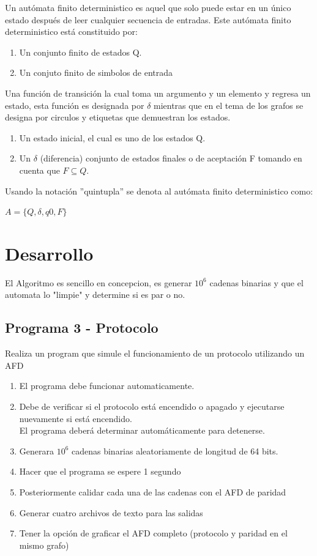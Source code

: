 \documentclass{article}
\begin{document}
    Un autómata finito deterministico es aquel que solo puede estar en un único estado después de leer cualquier
    secuencia de entradas. Este autómata finito deterministico está constituido por:
\begin{enumerate}
    \item Un conjunto finito de estados Q. 
    \item Un conjuto finito de simbolos de entrada
\end{enumerate}
    Una función de transición la cual toma un argumento y un elemento y regresa un estado, esta función es designada por $\delta$ mientras que en el tema de los grafos se designa por circulos y etiquetas que demuestran los estados.
\begin{enumerate}
    \item Un estado inicial, el cual es uno de los estados Q.
    \item Un $\delta$ (diferencia) conjunto de estados finales o de aceptación F tomando en cuenta que $F \subseteq  Q$.
\end{enumerate}
    
    Usando la notación ”quintupla” se denota al autómata finito deterministico como:
\begin{center}
    $A = \{Q, \delta , q0 , F \}$
\end{center}
    
\section{Desarrollo}
El Algoritmo es sencillo en concepcion, es generar $10^6$ cadenas binarias y que el automata lo "limpie" y determine si es par o no.

\subsection{Programa 3 - Protocolo}
Realiza un program que simule el funcionamiento de un protocolo utilizando un AFD\begin{enumerate}
    \item El programa debe funcionar automaticamente.
    \item Debe de verificar si el protocolo está encendido o apagado y ejecutarse nuevamente si está encendido. 
    \\El programa deberá determinar automáticamente para detenerse.
    \item Generara $10^6$ cadenas binarias aleatoriamente de longitud de 64 bits.
    \item Hacer que el programa se espere 1 segundo
    \item Posteriormente calidar cada una de las cadenas con el AFD de paridad
    \item Generar cuatro archivos de texto para las salidas
    \item Tener la opción de graficar el AFD completo (protocolo y paridad en el mismo grafo)
\end{enumerate} 
\end{document}
